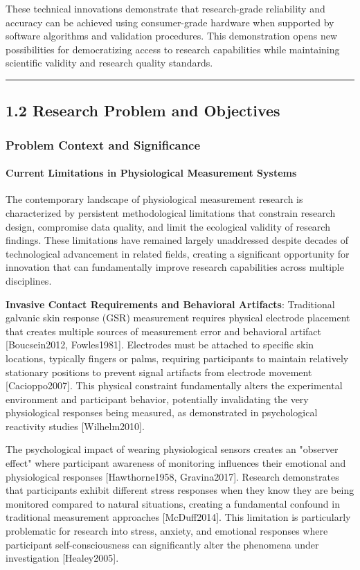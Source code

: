 \documentclass[11pt,a4paper]{article}
\begin{document}
These technical innovations demonstrate that research-grade reliability and accuracy
can be achieved using
consumer-grade hardware when supported by software algorithms and
validation procedures.  This
demonstration opens new possibilities for democratizing access to research
capabilities while maintaining
scientific validity and research quality standards.

\hrule

\subsection{1.2 Research Problem and Objectives}

\subsubsection{Problem Context and Significance}

\paragraph{Current Limitations in Physiological Measurement Systems}

The contemporary landscape of physiological measurement research is characterized by
persistent methodological
limitations that constrain research design, compromise data quality, and limit the
ecological validity of research
findings.  These limitations have remained largely unaddressed despite decades of
technological advancement in related
fields, creating a significant opportunity for innovation that can fundamentally
improve research capabilities across
multiple disciplines.

\textbf{Invasive Contact Requirements and Behavioral Artifacts}: Traditional galvanic skin response (GSR) measurement
requires physical electrode placement that creates multiple sources of measurement
error and behavioral
artifact [Boucsein2012, Fowles1981].  Electrodes must be attached to specific skin
locations, typically fingers or palms,
requiring participants to maintain relatively stationary positions to prevent signal
artifacts from electrode
movement [Cacioppo2007].  This physical constraint fundamentally alters the
experimental environment and participant
behavior, potentially invalidating the very physiological responses being measured,
as demonstrated in psychological
reactivity studies [Wilhelm2010].

The psychological impact of wearing physiological sensors creates an "observer
effect" where participant awareness of
monitoring influences their emotional and physiological responses [Hawthorne1958,
Gravina2017].  Research demonstrates
that participants exhibit different stress responses when they know they are being
monitored compared to natural
situations, creating a fundamental confound in traditional measurement approaches
[McDuff2014].  This limitation is
particularly problematic for research into stress, anxiety, and emotional responses
where participant self-consciousness
can significantly alter the phenomena under investigation [Healey2005].
\end{document}
